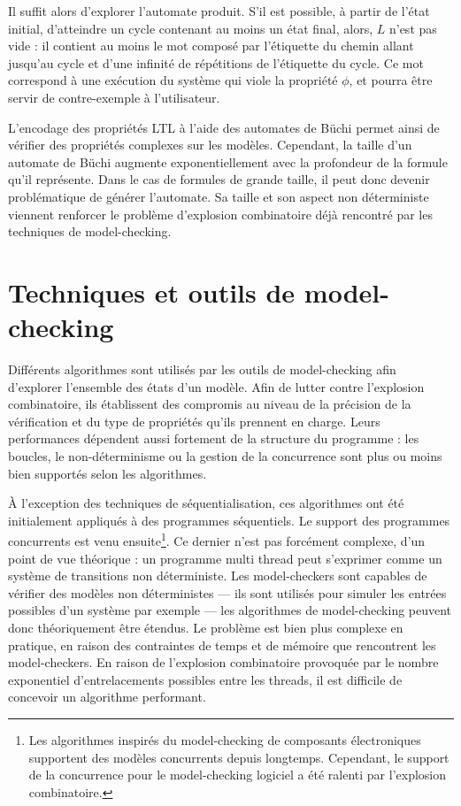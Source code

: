 Il suffit alors d'explorer l'automate produit. S’il est possible, à partir
de l'état initial, d'atteindre un cycle contenant au moins un état final, alors,
\(L\) n'est pas vide : il contient au moins le mot composé par l'étiquette du
chemin allant jusqu'au cycle et d'une infinité de répétitions de l'étiquette du
cycle. Ce mot correspond à une exécution du système qui viole la propriété \(\phi\),
et pourra être servir de contre-exemple à l'utilisateur.

L'encodage des propriétés \ac{LTL} à l'aide des automates de Büchi permet ainsi de
vérifier des propriétés complexes sur les modèles. Cependant, la taille d'un
automate de Büchi augmente exponentiellement avec la profondeur de la formule
qu'il représente. Dans le cas de formules de grande taille, il peut donc devenir
problématique de générer l'automate. Sa taille et son aspect non déterministe
viennent renforcer le problème d'explosion combinatoire déjà rencontré par les
techniques de model-checking.

\section{Techniques et outils de model-checking}
\label{sec:techniques-et-outils-de-model-checking}

Différents algorithmes sont utilisés par les outils de model-checking
afin d'explorer l'ensemble des états d'un modèle. Afin de lutter contre
l'explosion combinatoire, ils établissent des compromis au niveau de la
précision de la vérification et du type de propriétés qu'ils prennent en charge.
Leurs performances dépendent aussi fortement de la
structure du programme : les boucles, le non-déterminisme ou la gestion
de la concurrence sont plus ou moins bien supportés selon
les algorithmes.

À l'exception des techniques de séquentialisation, ces algorithmes ont été
initialement appliqués à des programmes séquentiels. Le support des programmes
concurrents est venu ensuite\footnote{Les algorithmes inspirés du model-checking
  de composants électroniques supportent des modèles concurrents depuis
  longtemps. Cependant, le support de la concurrence pour le model-checking
  logiciel a été ralenti par l'explosion combinatoire.}.
Ce dernier n'est pas forcément complexe, d'un point de vue théorique : un
programme multi thread peut s'exprimer comme un système de transitions
non déterministe. Les model-checkers sont capables de vérifier des modèles
non déterministes --- ils sont utilisés pour simuler les entrées possibles d'un
système par exemple --- les algorithmes de model-checking peuvent donc
théoriquement être étendus.
Le problème est bien plus complexe en pratique, en raison des contraintes de
temps et de mémoire que rencontrent les model-checkers. En raison de l'explosion
combinatoire provoquée par le nombre exponentiel d'entrelacements possibles
entre les threads, il est difficile de concevoir un algorithme performant.

